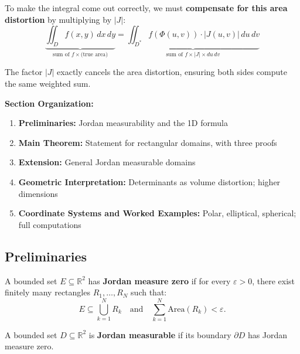 \documentclass[11pt]{report}
\newcommand{\R}{\mathbb{R}}
\begin{document}
To make the integral come out correctly, we must \textbf{compensate for this area distortion} by multiplying by $|J|$:
\[
\underbrace{\iint_D f(x, y) \, dx \, dy}_{\text{sum of } f \times \text{(true area)}} = \underbrace{\iint_{D^*} f(\Phi(u,v)) \cdot |J(u,v)| \, du \, dv}_{\text{sum of } f \times |J| \times du \, dv}
\]

The factor $|J|$ exactly cancels the area distortion, ensuring both sides compute the same weighted sum.

\medskip

\noindent\textbf{Section Organization:}
\begin{enumerate}
    \item \textbf{Preliminaries:} Jordan measurability and the 1D formula
    \item \textbf{Main Theorem:} Statement for rectangular domains, with three proofs
    \item \textbf{Extension:} General Jordan measurable domains
    \item \textbf{Geometric Interpretation:} Determinants as volume distortion; higher dimensions
    \item \textbf{Coordinate Systems and Worked Examples:} Polar, elliptical, spherical; full computations
\end{enumerate}

\subsection*{Preliminaries}

\begin{definition}
A bounded set $E \subseteq \R^2$ has \textbf{Jordan measure zero} if for every $\varepsilon > 0$, there exist finitely many rectangles $R_1, \ldots, R_N$ such that:
\[
E \subseteq \bigcup_{k=1}^N R_k \quad \text{and} \quad \sum_{k=1}^N \text{Area}(R_k) < \varepsilon.
\]
\end{definition}

\begin{definition}
A bounded set $D \subseteq \R^2$ is \textbf{Jordan measurable} if its boundary $\partial D$ has Jordan measure zero.
\end{definition}
\end{document}

